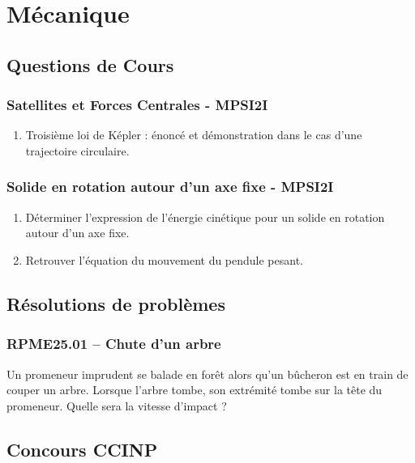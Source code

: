 \newpage
\section*{Mécanique}

\subsection*{Questions de Cours}

\subsubsection*{Satellites et Forces Centrales - MPSI2I}
\begin{enumerate}
\item Troisième loi de Képler : énoncé et démonstration dans le cas d'une trajectoire circulaire.
\end{enumerate}

\subsubsection*{Solide en rotation autour d'un axe fixe - MPSI2I}

\begin{enumerate}
\item Déterminer l'expression de l'énergie cinétique pour un solide en rotation autour d'un axe fixe.
\item Retrouver l'équation du mouvement du pendule pesant.
\end{enumerate}


\subsection*{Résolutions de problèmes}

\subsubsection*{RPME25.01 -- Chute d'un arbre}
Un promeneur imprudent se balade en forêt alors qu'un bûcheron est en train de couper un arbre. Lorsque l'arbre tombe, son extrémité tombe sur la tête du promeneur. Quelle sera la vitesse d'impact ?

\subsection*{Concours CCINP}

